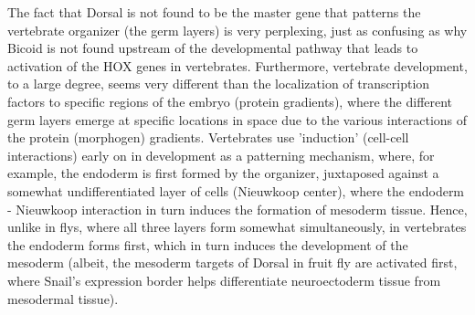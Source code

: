 The fact that Dorsal is not found to be the master gene that patterns the vertebrate organizer (the germ layers) is very perplexing, just as confusing as why Bicoid is not found upstream of the developmental pathway that leads to activation of the HOX genes in vertebrates.  Furthermore, vertebrate development, to a large degree, seems very different than the localization of transcription factors to specific regions of the embryo (protein gradients), where the different germ layers emerge at specific locations in space due to the various interactions of the protein (morphogen) gradients. Vertebrates use 'induction' (cell-cell interactions) early on in development as a patterning mechanism, where, for example, the endoderm is first formed by the organizer, juxtaposed against a somewhat undifferentiated layer of cells (Nieuwkoop center), where the endoderm - Nieuwkoop interaction in turn induces the formation of mesoderm tissue.  Hence, unlike in flys, where all three layers form somewhat simultaneously, in vertebrates the endoderm forms first, which in turn induces the development of the mesoderm (albeit, the mesoderm targets of Dorsal in fruit fly are activated first, where Snail's expression border helps differentiate neuroectoderm tissue from mesodermal tissue). 

